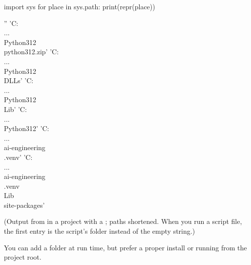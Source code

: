 \begin{pycode}
import sys
for place in sys.path:
    print(repr(place))
\end{pycode}
\begin{rawcode}
''
'C:\\...\\Python312\\python312.zip'
'C:\\...\\Python312\\DLLs'
'C:\\...\\Python312\\Lib'
'C:\\...\\Python312'
'C:\\...\\ai-engineering\\.venv'
'C:\\...\\ai-engineering\\.venv\\Lib\\site-packages'
\end{rawcode}

(Output from  in a project with a ; paths shortened.
When you run a script file, the first entry is the script's folder instead of the empty string.)

\begin{center}
\end{center}

You can add a folder at run time, but prefer a proper install or running from the project root.

